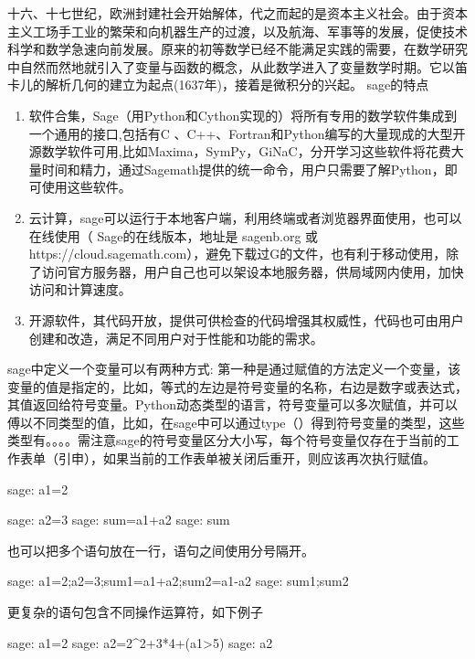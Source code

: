 \documentclass[a4paper]{article}
\begin{document}
十六、十七世纪，欧洲封建社会开始解体，代之而起的是资本主义社会。由于资本主义工场手工业的繁荣和向机器生产的过渡，以及航海、军事等的发展，促使技术科学和数学急速向前发展。原来的初等数学已经不能满足实践的需要，在数学研究中自然而然地就引入了变量与函数的概念，从此数学进入了变量数学时期。它以笛卡儿的解析几何的建立为起点(1637年)，接着是微积分的兴起。%
sage的特点
\begin{enumerate}
\item 软件合集，Sage（用Python和Cython实现的）将所有专用的数学软件集成到一个通用的接口,包括有C 、C++、Fortran和Python编写的大量现成的大型开源数学软件可用,比如Maxima，SymPy，GiNaC，分开学习这些软件将花费大量时间和精力，通过Sagemath提供的统一命令，用户只需要了解Python，即可使用这些软件。
\item 云计算，sage可以运行于本地客户端，利用终端或者浏览器界面使用，也可以在线使用（ Sage的在线版本，地址是 sagenb.org 或 https://cloud.sagemath.com），避免下载过G的文件，也有利于移动使用，除了访问官方服务器，用户自己也可以架设本地服务器，供局域网内使用，加快访问和计算速度。
\item 开源软件，其代码开放，提供可供检查的代码增强其权威性，代码也可由用户创建和改造，满足不同用户对于性能和功能的需求。 
\end{enumerate}
\begin{multicols}{2}
sage中定义一个变量可以有两种方式:
第一种是通过赋值的方法定义一个变量，该变量的值是指定的，比如，等式的左边是符号变量的名称，右边是数字或表达式，其值返回给符号变量。Python动态类型的语言，符号变量可以多次赋值，并可以傅以不同类型的值，比如，在sage中可以通过type（）得到符号变量的类型，这些类型有。。。。需注意sage的符号变量区分大小写，每个符号变量仅存在于当前的工作表单（引申），如果当前的工作表单被关闭后重开，则应该再次执行赋值。
\begin{sagecommandline}
sage: a1=2
\end{sagecommandline}
\begin{sagecommandline}
sage: a2=3
sage: sum=a1+a2
sage: sum
\end{sagecommandline}
也可以把多个语句放在一行，语句之间使用分号隔开。
\begin{sageexample}
sage: a1=2;a2=3;sum1=a1+a2;sum2=a1-a2
sage: sum1;sum2
\end{sageexample}

更复杂的语句包含不同操作运算符，如下例子
\begin{sageexample}
sage: a1=2
sage: a2=2^2+3*4+(a1>5)
sage: a2 
\end{sageexample}
\end{multicols}
\end{document}
